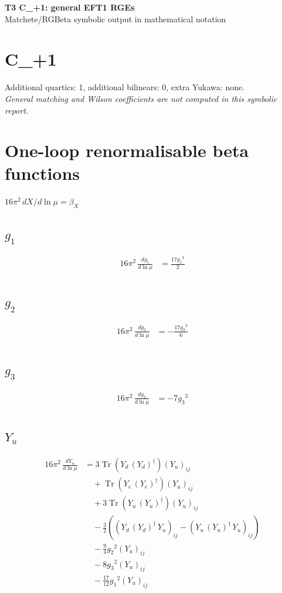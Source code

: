 \documentclass[10pt,a4paper]{article}
\begin{document}
\begin{center}
{\Large\bfseries T3 C\_+1: general EFT1 RGEs}\\[4pt]
Matchete/RGBeta symbolic output in mathematical notation
\end{center}
\bigskip
\section*{C\_+1}
Additional quartics: 1, additional bilinears: 0, extra Yukawa: none.\\
\emph{General matching and Wilson coefficients are not computed in this symbolic report.}
\clearpage
\section*{One-loop renormalisable beta functions}
$16\pi^2\,dX/d\ln\mu=\beta_X$
\subsection*{$g_1$}
\begin{align*}
16\pi^2\,\frac{d g_1}{d\ln\mu} &=\frac{17 {g_1}^3}{2} \\
\end{align*}
\subsection*{$g_2$}
\begin{align*}
16\pi^2\,\frac{d g_2}{d\ln\mu} &=-\frac{17 {g_2}^3}{6} \\
\end{align*}
\subsection*{$g_3$}
\begin{align*}
16\pi^2\,\frac{d g_3}{d\ln\mu} &=-7 {g_3}^3 \\
\end{align*}
\subsection*{$Y_u$}
\begin{align*}
16\pi^2\,\frac{d Y_u}{d\ln\mu} &=3 \operatorname{Tr}\!\left({Y_d}\,\left({Y_d}\right)^{\dagger}\right) \left({Y_u}\right)_{ij} \\
&\quad +\operatorname{Tr}\!\left({Y_e}\,\left({Y_e}\right)^{\dagger}\right) \left({Y_u}\right)_{ij} \\
&\quad +3 \operatorname{Tr}\!\left({Y_u}\,\left({Y_u}\right)^{\dagger}\right) \left({Y_u}\right)_{ij} \\
&\quad -\frac{3}{2} (\left({Y_d}\,\left({Y_d}\right)^{\dagger}\,{Y_u}\right)_{ij}-\left({Y_u}\,\left({Y_u}\right)^{\dagger}\,{Y_u}\right)_{ij}) \\
&\quad -\frac{9}{4} {g_2}^2 \left({Y_u}\right)_{ij} \\
&\quad -8 {g_3}^2 \left({Y_u}\right)_{ij} \\
&\quad -\frac{17}{12} {g_1}^2 \left({Y_u}\right)_{ij} \\
\end{align*}
\end{document}
